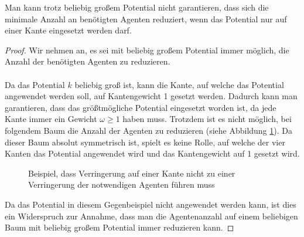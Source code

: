 \begin{theorem}
	Man kann trotz beliebig großem Potential nicht garantieren, dass sich die minimale Anzahl an benötigten Agenten reduziert, wenn das Potential nur auf einer Kante eingesetzt werden darf.
\end{theorem}

\begin{proof}
	Wir nehmen an, es sei mit beliebig großem Potential immer möglich, die Anzahl der benötigten Agenten zu reduzieren.
	\\
	\\	
	Da das Potential $k$ beliebig groß ist, kann die Kante, auf welche das Potential angewendet werden soll, auf Kantengewicht 1 gesetzt werden. Dadurch kann man garantieren, dass das größtmögliche Potential eingesetzt worden ist, da jede Kante immer ein Gewicht $\omega \geq 1$ haben muss. Trotzdem ist es nicht möglich, bei folgendem Baum die Anzahl der Agenten zu reduzieren (siehe Abbildung \ref{abb_gegenbeispielMaxPotential}). Da dieser Baum absolut symmetrisch ist, spielt es keine Rolle, auf welche der vier Kanten das Potential angewendet wird und das Kantengewicht auf 1 gesetzt wird.
	
	\begin{figure}[hbt]
		
		\captionsetup{width=0.9\textwidth}
		\caption{Beispiel, dass Verringerung auf einer Kante nicht zu einer Verringerung der notwendigen Agenten führen muss} 
		\label{abb_gegenbeispielMaxPotential}
	\end{figure} 
	
	Da das Potential in diesem Gegenbeispiel nicht angewendet werden kann, ist dies ein Widerspruch zur Annahme, dass man die Agentenanzahl auf einem beliebigen Baum mit beliebig großem Potential immer reduzieren kann.
\end{proof}

